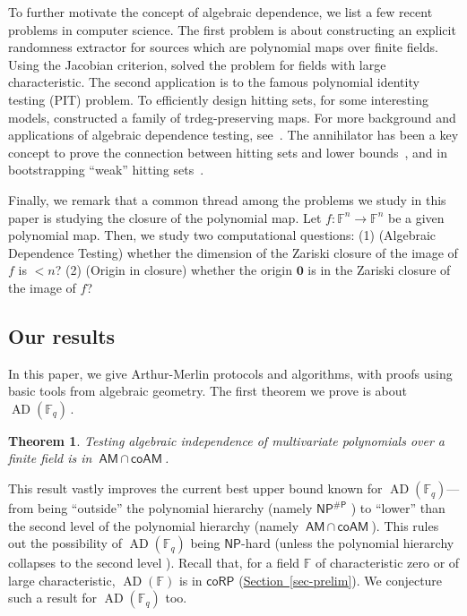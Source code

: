 \documentclass[11pt]{article}
\numberwithin{equation}{section}
\newtheorem{theorem}{Theorem}[section]
\theoremstyle{definition}
\theoremstyle{plain}
\newcommand{\cclass}[1]{\textsf{#1}}
\newcommand{\expref}[2]{\hyperref[#2]{#1~\ref{#2}}}
\newcommand{\F}{\mathbb{F}}
\newcommand{\Pclass}{\cclass{P}\xspace}  %
\newcommand{\NP}{\cclass{NP}\xspace}  %
\newcommand{\coRP}{\cclass{coRP}\xspace}  %
\newcommand{\AM}{\cclass{AM}\xspace}  %
\newcommand{\coAM}{\cclass{coAM}\xspace}  %
\newcommand{\AMcapcoAM}{\AM\,\cap\,\coAM}  %
\DeclareMathOperator{\AD}{\mathrm{AD}\xspace} %
\begin{document}
\smallskip 
To further motivate the concept of algebraic dependence, we list a few recent problems in computer science.
 The first problem is about constructing an explicit randomness extractor for sources which are polynomial maps over finite fields. Using the Jacobian criterion, \cite{DGW09, bib:Dvi09} solved the problem for fields with large characteristic.
 The second application is
%
to   %
the famous polynomial identity testing (PIT) problem. To efficiently design hitting sets, for some interesting models, 
 \cite{BMS13, ASSS11, KS15} constructed a family of trdeg-preserving maps. For more background and applications of algebraic dependence testing, see~\cite{pandey2016algebraic}. The annihilator has been a key concept to prove the connection between hitting sets and lower bounds~\cite{heintz1980testing}, and in  bootstrapping ``weak'' hitting sets~\cite{AGS17}. 

Finally, we remark that a common thread among the problems we study in this paper is studying the closure of the polynomial map.
Let $f:\F^n \to \F^n$ be a given polynomial map. Then, we study two computational questions: (1) (Algebraic Dependence Testing) whether 
the %
dimension of 
%
the Zariski closure of the image of $f$  %
is $< n$? (2) (Origin in closure) whether 
%
the origin $\mathbf{0}$ is in the Zariski closure of the image of $f$? %

%
\subsection{Our results}\label{contrib}
%

In this paper, we give Arthur-Merlin protocols
%
and   %
algorithms, with proofs using basic tools from algebraic geometry. The first theorem we prove is about
%
$\AD(\F_q)$\,.   %


\begin{theorem}\label{thm_amcoam}
%
%
%
Testing algebraic independence of multivariate polynomials over a
finite field is in
%
$\AMcapcoAM$.
%
%
\end{theorem}

 
This result vastly improves the current best upper bound known
for
%
$\AD(\F_q)$---from  %
being ``outside'' the polynomial hierarchy (namely
%
$\NP^{\#\Pclass}$   %
\cite{mittmann2014algebraic}) to ``lower'' than the
%
second level   %
of
the  %
polynomial hierarchy (namely
%
$\AMcapcoAM$).    %
This rules out the possibility
%
of $\AD(\F_q)$   %
being $\NP$-hard (unless
the  %
polynomial hierarchy collapses to the
%
second level   %
\cite{AB09}).  %
Recall that,
%
for a field $\F$ of characteristic zero or of large characteristic,  %
%
$\AD(\F)$   %
is in
%
$\coRP$  %
(\expref{Section}{sec-prelim}). We conjecture such a result for
%
$\AD(\F_q)$    %
too.
\end{document}
